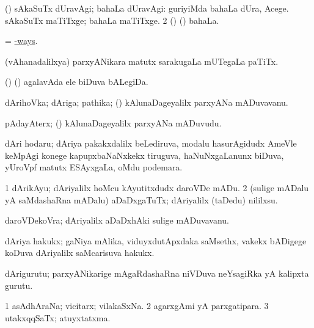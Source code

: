 \bentry
{} 
\gl{\kirxvi}
\expl{}
\bmng
\bnum
{} (\AmA) 
\banum
{} sAkaSuTx dUravAgi; bahaLa dUravAgi:  guriyiMda bahaLa dUra, Acege. 
 sAkaSuTx maTiTxge; bahaLa maTiTxge. 
\eanum
\numie
\num{2} (\ame) (\AmA) bahaLa. 
\enum
\emng
\eentry

\bentry
{} 
\gl{\uparx}
\expl{}
\bmng
= \hyperlink{hyp-ways}{-ways}. 
\emng
\eentry

\bentry
{} 
\gl{\nA}
\expl{}
\bmng
(vAhanadalilxya) parxyANikara matutx sarakugaLa mUTegaLa paTiTx. 
\emng
\eentry

\bentry
{} 
\gl{\nA}
\expl{}
\bmng
(\birx) (\pArxparx) agalavAda ele biDuva bALegiDa. 
\emng
\eentry

\bentry
{} 
\gl{\nA}
\expl{}
\bmng
dArihoVka; dAriga; pathika; (\kanmu) kAlunaDageyalilx parxyANa mADuvavanu. 
\emng
\eentry

\bentry
{} 
\gl{\nA}
\expl{}
\bmng
pAdayAterx; (\kanmu) kAlunaDageyalilx parxyANa mADuvudu. 
\emng
\eentry

\bentry
{} 
\gl{\nA}
\expl{}
\bmng
dAri hodaru; dAriya pakakxdalilx beLediruva, modalu hasurAgidudx AmeVle keMpAgi konege kapupxbaNaNxkekx tiruguva, haNuNxgaLanunx biDuva, yUroVpf matutx ESAyxgaLa, oMdu podemara. 
\emng
\eentry

\bentry
{} 
\gl{\sakirx}
\bmng
\bnum
\num{1} dArikAyu; dAriyalilx hoMcu kAyutitxdudx daroVDe mADu. 
\num{2} (sulige mADalu yA saMdashaRna mADalu) aDaDxgaTuTx; dAriyalilx (taDedu) nililxsu. 
\enum
\emng
\eentry

\bentry
{} 
\gl{\nA}
\expl{}
\bmng
daroVDekoVra; dAriyalilx aDaDxhAki sulige mADuvavanu. 
\emng
\eentry

\bentry
{} 
\gl{\nA}
\expl{}
\bmng
dAriya hakukx; gaNiya mAlika, viduyxdutApxdaka saMsethx, \mo vakekx bADigege koDuva dAriyalilx saMcarisuva hakukx. 
\emng
\eentry

\bentry
{} 
\gl{\nA}
\expl{}
\bmng
dArigurutu; parxyANikarige mAgaRdashaRna niVDuva neYsagiRka yA kalipxta gurutu. 
\emng
\eentry

\bentry
{} 
\gl{\gu}
\expl{}
\bmng
\bnum
\num{1} asAdhAraNa; vicitarx; vilakaSxNa. 
\num{2} agarxgAmi yA parxgatipara. 
\num{3} utakxqqSaTx; atuyxtatxma. 
\enum
\emng
\eentry

